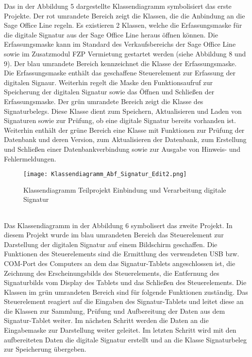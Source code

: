 Das in der Abbildung 5 dargestellte Klassendiagramm symbolisiert das erste Projekte. Der rot umrandete Bereich zeigt die Klassen, die die Anbindung an die Sage Office Line regeln. Es existieren 2 Klassen, welche die Erfassungsmaske für die digitale Signatur aus der Sage Office Line heraus öffnen können. Die Erfassungsmaske kann im Standard des Verkaufsbereichs der Sage Office Line sowie im Zusatzmodul FZP Vermietung gestartet werden (siehe Abbildung 8 und 9). Der blau umrandete Bereich kennzeichnet die Klasse der Erfassungsmaske. Die Erfassungsmaske enthält das geschaffene Steuerelement zur Erfassung der digitalen Signaur. Weiterhin regelt die Maske den Funktionsaufruf zur Speicherung der digitalen Signatur sowie das Öffnen und Schließen der Erfassungsmaske. Der grün umrandete Bereich zeigt die Klasse des Signaturbelegs. Diese Klasse dient zum Speichern, Aktualisieren und Laden von Signaturen sowie zur Prüfung, ob eine digitale Signatur bereits vorhanden ist. Weiterhin enthält der grüne Bereich eine Klasse mit Funktionen zur Prüfung der Datenbank und deren Version, zum Aktualisieren der Datenbank, zum Erstellung und Schließen einer Datenbankverbindung sowie zur Ausgabe von Hinweis- und Fehlermeldungen.
\begin{figure}[!ht]
    \centering
    \texttt{[image: Klassendiagramm\_Abf\_Signatur\_Edit2.png]}
    \caption[Klassendiagramm Einbindung und Verarbeitung digitale Signatur]{\small{Klassendiagramm Teilprojekt Einbindung und Verarbeitung digitale Signatur}}
\end{figure}\\
Das Klassendiagramm in der Abbildung 6 symbolisert das zweite Projekt. In diesem Projekt wurde im blau umrandeten Bereich das Steuerelement zur Darstellung der digitalen Signatur auf einem Bildschirm geschaffen. Die Funktionen des Steuerelements sind die Ermittlung des verwendeten USB bzw. COM-Port des Computers an dem das Signatur-Tablets angeschlossen ist, die Zeichnung des Erscheinungsbilds des Steuerelements, die Entfernung des Signaturbilds vom Display des Tablets und das Schließen des Steuerelements. Die Klassen im grün umrandeten Bereich sind für folgende Funktionen zuständig. Das Steuerelement reagiert auf die Eingaben des Signatur-Tablets und leitet diese an die Klassen zur Sammlung, Prüfung und Aufbereitung der Daten aus dem Signatur-Tablet weiter. Im nächsten Schritt werden die Daten an die Eingabemaske zur Darstellung weiter geleitet. Im letzten Schritt wird mit den aufbereiteten Daten die digitale Signatur erstellt und an die Klasse Signaturbeleg zur Speicherung übergeben.

